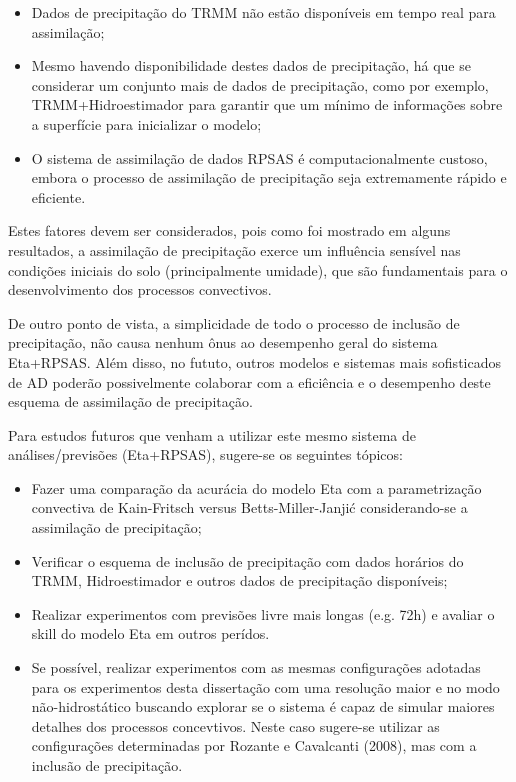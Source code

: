 \begin{itemize}
\item Dados de precipitação do TRMM não estão disponíveis em tempo real para assimilação;
\item Mesmo havendo disponibilidade destes dados de precipitação, há que se considerar um conjunto mais de dados de precipitação, como por exemplo, TRMM+Hidroestimador para garantir que um mínimo de informações sobre a superfície para inicializar o modelo;
\item O sistema de assimilação de dados RPSAS é computacionalmente custoso, embora o processo de assimilação de precipitação seja extremamente rápido e eficiente.
\end{itemize}

Estes fatores devem ser considerados, pois como foi mostrado em alguns resultados, a assimilação de precipitação exerce um influência sensível nas condições iniciais do solo (principalmente umidade), que são fundamentais para o desenvolvimento dos processos convectivos.

De outro ponto de vista, a simplicidade de todo o processo de inclusão de precipitação, não causa nenhum ônus ao desempenho geral do sistema Eta+RPSAS. Além disso, no fututo, outros modelos e sistemas mais sofisticados de AD poderão possivelmente colaborar com a eficiência e o desempenho deste esquema de assimilação de precipitação.

Para estudos futuros que venham a utilizar este mesmo sistema de análises/previsões (Eta+RPSAS), sugere-se os seguintes tópicos:

\begin{itemize}
\item Fazer uma comparação da acurácia do modelo Eta com a parametrização convectiva de Kain-Fritsch versus Betts-Miller-Janjić considerando-se a assimilação de precipitação;
\item Verificar o esquema de inclusão de precipitação com dados horários do TRMM, Hidroestimador e outros dados de precipitação disponíveis;
\item Realizar experimentos com previsões livre mais longas (e.g. 72h) e avaliar o skill do modelo Eta em outros perídos.
\item Se possível, realizar experimentos com as mesmas configurações adotadas para os experimentos desta dissertação com uma resolução maior e no modo não-hidrostático buscando explorar se o sistema é capaz de simular maiores detalhes dos processos concevtivos. Neste caso sugere-se utilizar as configurações determinadas por Rozante e Cavalcanti (2008), mas com a inclusão de precipitação.
\end{itemize}